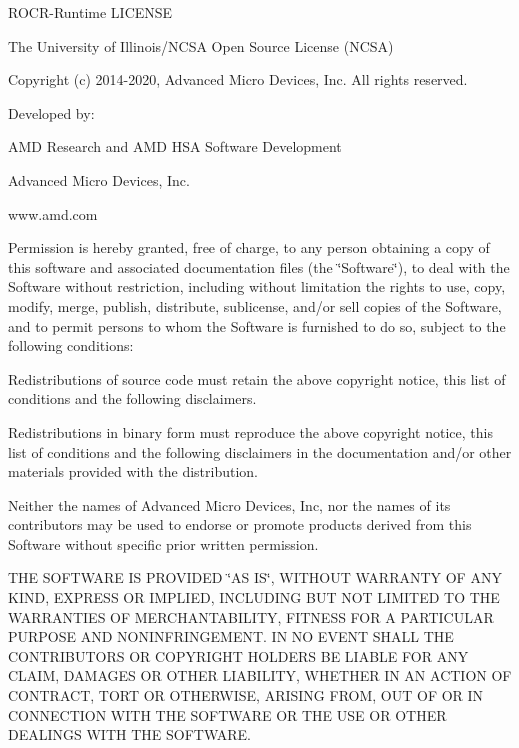 ROCR-\/\+Runtime LICENSE

The University of Illinois/\+NCSA Open Source License (NCSA)

Copyright (c) 2014-\/2020, Advanced Micro Devices, Inc. All rights reserved.

Developed by\+: \begin{DoxyVerb}            AMD Research and AMD HSA Software Development

            Advanced Micro Devices, Inc.

            www.amd.com
\end{DoxyVerb}
 Permission is hereby granted, free of charge, to any person obtaining a copy of this software and associated documentation files (the \char`\"{}\+Software\char`\"{}), to deal with the Software without restriction, including without limitation the rights to use, copy, modify, merge, publish, distribute, sublicense, and/or sell copies of the Software, and to permit persons to whom the Software is furnished to do so, subject to the following conditions\+:


\begin{DoxyItemize}
\item Redistributions of source code must retain the above copyright notice, this list of conditions and the following disclaimers.
\item Redistributions in binary form must reproduce the above copyright notice, this list of conditions and the following disclaimers in the documentation and/or other materials provided with the distribution.
\item Neither the names of Advanced Micro Devices, Inc, nor the names of its contributors may be used to endorse or promote products derived from this Software without specific prior written permission.
\end{DoxyItemize}

THE SOFTWARE IS PROVIDED \char`\"{}\+AS IS\char`\"{}, WITHOUT WARRANTY OF ANY KIND, EXPRESS OR IMPLIED, INCLUDING BUT NOT LIMITED TO THE WARRANTIES OF MERCHANTABILITY, FITNESS FOR A PARTICULAR PURPOSE AND NONINFRINGEMENT. IN NO EVENT SHALL THE CONTRIBUTORS OR COPYRIGHT HOLDERS BE LIABLE FOR ANY CLAIM, DAMAGES OR OTHER LIABILITY, WHETHER IN AN ACTION OF CONTRACT, TORT OR OTHERWISE, ARISING FROM, OUT OF OR IN CONNECTION WITH THE SOFTWARE OR THE USE OR OTHER DEALINGS WITH THE SOFTWARE. 